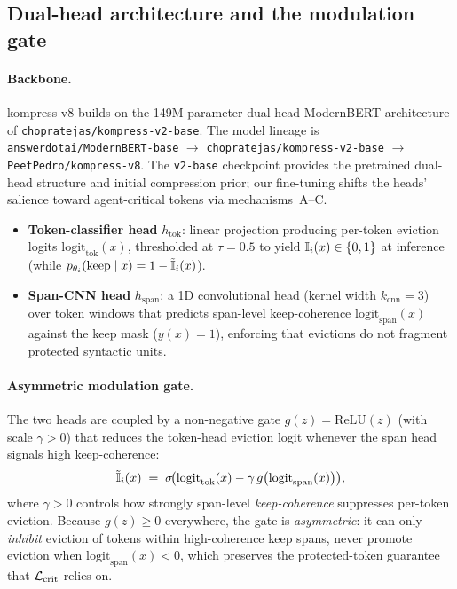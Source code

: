 \subsection{Dual-head architecture and the modulation gate}
\label{sec:arch}

\paragraph{Backbone.} kompress-v8 builds on the 149M-parameter dual-head
ModernBERT \citep{warner2024modernbert} architecture of
\texttt{chopratejas/kompress-v2-base}. The model lineage is
\texttt{answerdotai/ModernBERT-base} $\to$
\texttt{chopratejas/kompress-v2-base} $\to$ \texttt{PeetPedro/kompress-v8}.
The \texttt{v2-base} checkpoint provides the pretrained dual-head structure and
initial compression prior; our fine-tuning shifts the heads' salience toward
agent-critical tokens via mechanisms~A--C.

\begin{itemize}
  \item \textbf{Token-classifier head} $h_{\mathrm{tok}}$: linear projection
        producing per-token eviction logits $\mathrm{logit}_{\mathrm{tok}}(x)$,
        thresholded at $\tau=0.5$ to yield $\mathbb{I}_i(x)\in\{0,1\}$ at inference
        (while $p_{\theta_i}(\text{keep}\mid x) = 1 - \tilde{\mathbb{I}}_i(x)$).
  \item \textbf{Span-CNN head} $h_{\mathrm{span}}$: a 1D convolutional head
        (kernel width $k_{\mathrm{cnn}}{=}3$) over token windows that predicts
        span-level keep-coherence $\mathrm{logit}_{\mathrm{span}}(x)$ against
        the keep mask ($y(x)=1$), enforcing that evictions do not fragment
        protected syntactic units.
\end{itemize}

\paragraph{Asymmetric modulation gate.} The two heads are coupled by a
non-negative gate $g(z) = \mathrm{ReLU}(z)$ (with scale $\gamma > 0$) that
reduces the token-head eviction logit whenever the span head signals high
keep-coherence:
\[
  \tilde{\mathbb{I}}_i(x)
  \;=\;
  \sigma\!\bigl(\mathrm{logit}_{\mathrm{tok}}(x)
                - \gamma\, g\bigl(\mathrm{logit}_{\mathrm{span}}(x)\bigr)\bigr),
\]
where $\gamma > 0$ controls how strongly span-level \emph{keep-coherence}
suppresses per-token eviction. Because $g(z)\ge 0$ everywhere, the gate is
\emph{asymmetric}: it can only \emph{inhibit} eviction of tokens within
high-coherence keep spans, never promote eviction when
$\mathrm{logit}_{\mathrm{span}}(x) < 0$, which preserves the protected-token
guarantee that $\mathcal{L}_{\mathrm{crit}}$ relies on.

